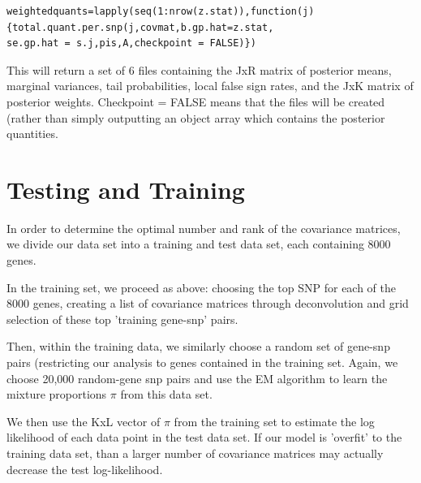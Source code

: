 \documentclass[10pt]{article}
\begin{document}
\begin{itemize}
 \begin{verbatim}
weightedquants=lapply(seq(1:nrow(z.stat)),function(j){total.quant.per.snp(j,covmat,b.gp.hat=z.stat,
se.gp.hat = s.j,pis,A,checkpoint = FALSE)})
\end{verbatim}                          
%  
%
This will return a set of 6 files containing the JxR matrix of posterior means, marginal variances, tail probabilities, local false sign rates, and the JxK matrix of posterior weights. Checkpoint = FALSE means that the files will be created (rather than simply outputting an object array which contains the posterior quantities.


\section{Testing and Training}

In order to determine the optimal number and rank of the covariance matrices, we divide our data set into a training and test data set, each containing 8000 genes.

In the training set, we proceed as above: choosing the top SNP for each of the 8000 genes, creating a list of covariance matrices through deconvolution and grid selection of these top 'training gene-snp' pairs. 

Then, within the training data, we similarly choose a random set of gene-snp pairs (restricting our analysis to genes contained in the training set. Again, we choose 20,000 random-gene snp pairs and use the EM algorithm to learn the mixture proportions $\pi$  from this data set.

We then use the KxL vector of $\pi$ from the training set to estimate the log likelihood of each data point in the test data set. If our model is 'overfit' to the training data set, than a larger number of covariance matrices may actually decrease the test log-likelihood. 


\end{itemize}
\end{document}
